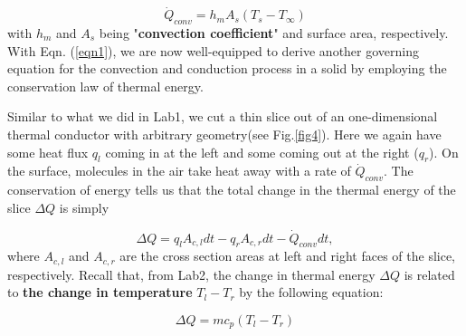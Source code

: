 \begin{equation}
    \dot{Q}_{conv}=h_mA_s(T_s-T_{\infty})
    \label{eqn1}
\end{equation}
with $h_m$ and $A_s$ being "\textbf{convection coefficient}" and surface area, respectively. With Eqn. (\ref{eqn1}), we are now well-equipped to derive another governing equation for the convection and conduction process in a solid by employing the conservation law of thermal energy.

Similar to what we did in Lab1, we cut a thin slice out of an one-dimensional thermal conductor with arbitrary geometry(see Fig.\ref{fig4}). Here we again have some heat flux $q_l$ coming in at the left and some coming out at the right ($q_r$). On the surface, molecules in the air take heat away with a rate of $\dot{Q}_{conv}$. The conservation of energy tells us that the total change in the thermal energy of the slice $\Delta Q$ is simply

\begin{equation}
    \Delta Q=q_lA_{c,l}dt-q_rA_{c,r}dt-\dot{Q}_{conv}dt,\label{eqn2}
\end{equation}
where $A_{c,l}$ and $A_{c,r}$ are the cross section areas at left and right faces of the slice, respectively. Recall that, from Lab2, the change in thermal energy $\Delta Q$ is related to \textbf{the change in temperature} $T_l-T_r$ by the following equation:

\begin{equation}
    \Delta Q=mc_p(T_l-T_r)
\end{equation}

